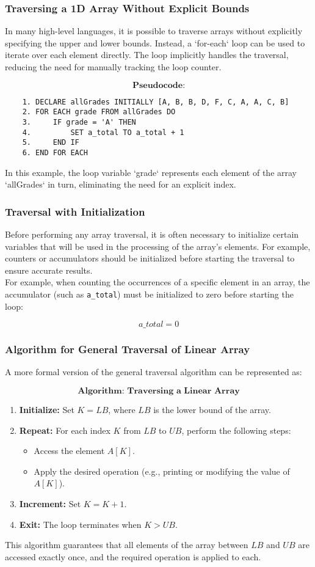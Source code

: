 \documentclass[12pt, oneside]{book}
\begin{document}
\subsubsection{Traversing a 1D Array Without Explicit Bounds}
In many high-level languages, it is possible to traverse arrays without explicitly specifying the upper and lower bounds. Instead, a `for-each` loop can be used to iterate over each element directly. The loop implicitly handles the traversal, reducing the need for manually tracking the loop counter.

\[
\textbf{Pseudocode:}
\]
\begin{verbatim}
	1. DECLARE allGrades INITIALLY [A, B, B, D, F, C, A, A, C, B]
	2. FOR EACH grade FROM allGrades DO
	3.     IF grade = 'A' THEN
	4.         SET a_total TO a_total + 1
	5.     END IF
	6. END FOR EACH
\end{verbatim}
In this example, the loop variable `grade` represents each element of the array `allGrades` in turn, eliminating the need for an explicit index.

\subsubsection{Traversal with Initialization}
Before performing any array traversal, it is often necessary to initialize certain variables that will be used in the processing of the array's elements. For example, counters or accumulators should be initialized before starting the traversal to ensure accurate results.\\For example, when counting the occurrences of a specific element in an array, the accumulator (such as \texttt{a\_total}) must be initialized to zero before starting the loop:

\[
a\_total = 0
\]
  
\subsubsection{Algorithm for General Traversal of Linear Array}
A more formal version of the general traversal algorithm can be represented as:

\[
\textbf{Algorithm: Traversing a Linear Array}
\]
\begin{enumerate}
	\item \textbf{Initialize:} Set \( K = LB \), where \( LB \) is the lower bound of the array.
	\item \textbf{Repeat:} For each index \( K \) from \( LB \) to \( UB \), perform the following steps:
	\begin{itemize}
		\item Access the element \( A[K] \).
		\item Apply the desired operation (e.g., printing or modifying the value of \( A[K] \)).
	\end{itemize}
	\item \textbf{Increment:} Set \( K = K + 1 \).
	\item \textbf{Exit:} The loop terminates when \( K > UB \).
\end{enumerate}
This algorithm guarantees that all elements of the array between \( LB \) and \( UB \) are accessed exactly once, and the required operation is applied to each.
\end{document}
